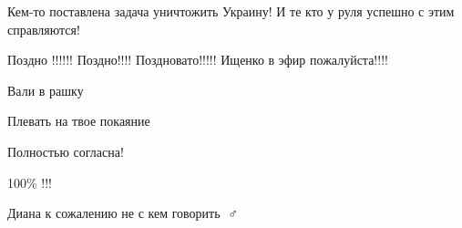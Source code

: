 \begin{itemize}
Кем-то поставлена задача уничтожить Украину! И те кто у руля успешно с этим справляются!

 
Поздно !!!!!! Поздно!!!! Поздновато!!!!! Ищенко в эфир пожалуйста!!!!

 
Вали в рашку

 
Плевать на твое покаяние

 
Полностью согласна!

 
100\% !!!

 
Диана к сожалению не с кем говорить 🤷♂️

 

\end{itemize}
